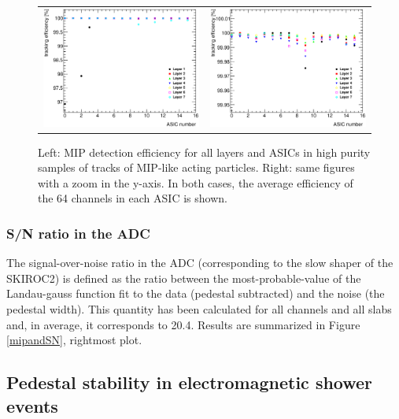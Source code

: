 \documentclass[a4paper,11pt]{article}
\begin{document}
\begin{figure}[!t]
  \centering 
    \begin{tabular}{ll}
      \includegraphics[width=2.8in]{figs/MIP/efficiency_nhits4_chips.eps} & \includegraphics[width=2.8in]{figs/MIP/efficiency_nhits4_chips_zoom.eps} \\
    \end{tabular}
    \caption{Left: MIP detection efficiency for all layers and ASICs in high purity samples of tracks of MIP-like acting particles. Right: same figures with a zoom in the y-axis. In both cases, the average efficiency of the 64 channels in each ASIC is shown.}
\label{efficiency}
\end{figure}


\subsubsection{S/N ratio in the ADC}
\label{sec:mip}

The signal-over-noise ratio in the ADC (corresponding to the slow shaper of the SKIROC2) is defined 
as the ratio between the most-probable-value of
the Landau-gauss function fit to the data (pedestal subtracted) and the noise (the pedestal width). This quantity 
has been calculated for all channels and all slabs and, in average, it corresponds to 20.4.
Results are summarized in Figure \ref{mipandSN}, rightmost plot.


\subsection{Pedestal stability in electromagnetic shower events}
\label{sec:showers}
\end{document}
